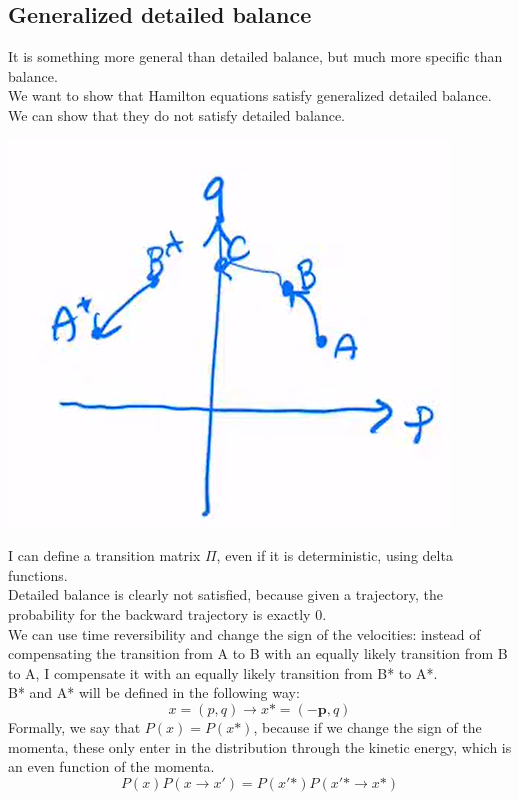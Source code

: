 \subsection{Generalized detailed balance}
It is something more general than detailed balance, but much more specific than balance.\\
We want to show that Hamilton equations satisfy generalized detailed balance.\\We can show that they do not satisfy detailed balance.\\
\begin{center}\includegraphics[scale=0.35]{Monte Carlo/images/lect2/img7}\end{center}
I can define a transition matrix $\Pi$, even if it is deterministic, using delta functions.\\
Detailed balance is clearly not satisfied, because given a trajectory, the probability for the backward trajectory is exactly 0.\\
We can use time reversibility and change the sign of the velocities: instead of compensating the transition from A to B with an equally likely transition from B to A, I compensate it with an equally likely transition from B* to A*.\\
B* and A* will be defined in the following way:
\[x = (p, q) \rightarrow x\text{*} = (\mathbf{-p}, q)\]
Formally, we say that $P(x)=P(x\text{*})$, because if we change the sign of the momenta, these only enter in the distribution through the kinetic energy, which is an even function of the momenta.\\
\[P(x)P(x\rightarrow x') = P(x'\text{*})P(x'\text{*}\rightarrow x\text{*})\]
